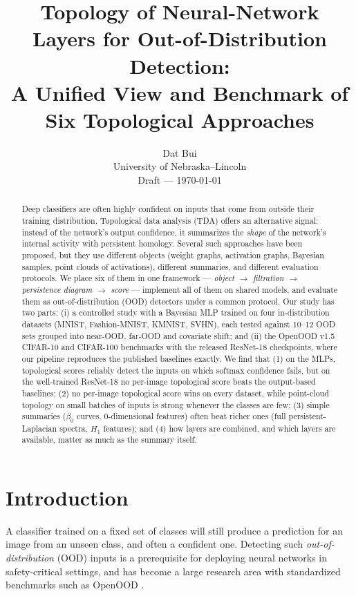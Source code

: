 \documentclass[11pt]{article}
\title{Topology of Neural-Network Layers for Out-of-Distribution Detection:\\
A Unified View and Benchmark of Six Topological Approaches}
\author{Dat Bui\\ University of Nebraska--Lincoln \\ \small Draft --- \today}
\date{}
\begin{document}
\maketitle

\begin{abstract}
Deep classifiers are often highly confident on inputs that come from outside their training
distribution. Topological data analysis (TDA) offers an alternative signal: instead of the
network's output confidence, it summarizes the \emph{shape} of the network's internal activity
with persistent homology. Several such approaches have been proposed, but they use different
objects (weight graphs, activation graphs, Bayesian samples, point clouds of activations),
different summaries, and different evaluation protocols. We place six of them in one framework
--- \emph{object $\to$ filtration $\to$ persistence diagram $\to$ score} --- implement all of them
on shared models, and evaluate them as out-of-distribution (OOD) detectors under a common
protocol. Our study has two parts: (i) a controlled study with a Bayesian MLP trained on four
in-distribution datasets (MNIST, Fashion-MNIST, KMNIST, SVHN), each tested against 10--12 OOD
sets grouped into near-OOD, far-OOD and covariate shift; and (ii) the OpenOOD v1.5 CIFAR-10 and
CIFAR-100 benchmarks with the released ResNet-18 checkpoints, where our pipeline reproduces the
published baselines exactly. We find that (1) on the MLPs, topological scores reliably detect the
inputs on which softmax confidence fails, but on the well-trained ResNet-18 no per-image
topological score beats the output-based baselines; (2) no per-image topological score wins on
every dataset, while point-cloud topology on small batches of inputs is strong whenever the
classes are few; (3) simple summaries ($\beta_0$ curves, 0-dimensional features) often beat richer
ones (full persistent-Laplacian spectra, $H_1$ features); and (4) how layers are combined, and
which layers are available, matter as much as the summary itself.
\end{abstract}

\section{Introduction}
\label{sec:intro}
A classifier trained on a fixed set of classes will still produce a prediction for an image
from an unseen class, and often a confident one. Detecting such \emph{out-of-distribution}
(OOD) inputs is a prerequisite for deploying neural networks in safety-critical settings, and
has become a large research area with standardized benchmarks such as OpenOOD
\citep{yang2022openood,zhang2023openood}.
\end{document}
